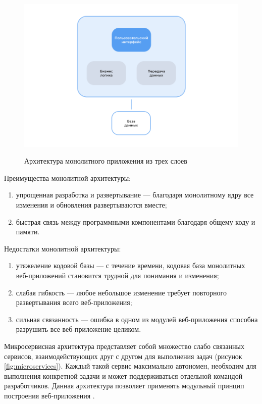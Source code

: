 \begin{figure}[H]
\begin{center}
\includegraphics[width=0.9\hsize]{fig/monolit.png}\\[2mm]
\caption{Архитектура монолитного приложения из трех слоев}\label{fig:monolit}
\end{center}
\end{figure}

Преимущества монолитной архитектуры:

\begin{enumerate} 
  \item упрощенная разработка и развертывание — благодаря монолитному ядру все изменения и обновления развертываются вместе;
  
  \item быстрая связь между программными компонентами благодаря общему коду и памяти.
\end{enumerate}

Недостатки монолитной архитектуры:

\begin{enumerate} 
  \item утяжеление кодовой базы — с течение времени, кодовая база монолитных веб-приложений становится трудной для понимания и изменения;
  
  \item слабая гибкость — любое небольшое изменение требует повторного развертывания всего веб-приложения;
  
  \item сильная связанность — ошибка в одном из модулей веб-приложения способна разрушить все веб-приложение целиком.
\end{enumerate}

Микросервисная архитектура представляет собой множество слабо связанных сервисов, взаимодействующих друг с другом для выполнения задач (рисунок \ref{fig:microservices}). Каждый такой сервис максимально автономен, необходим для выполнения конкретной задачи и может поддерживаться отдельной командой разработчиков. Данная архитектура позволяет применять модульный принцип построения веб-приложения \cite{microservice}.

